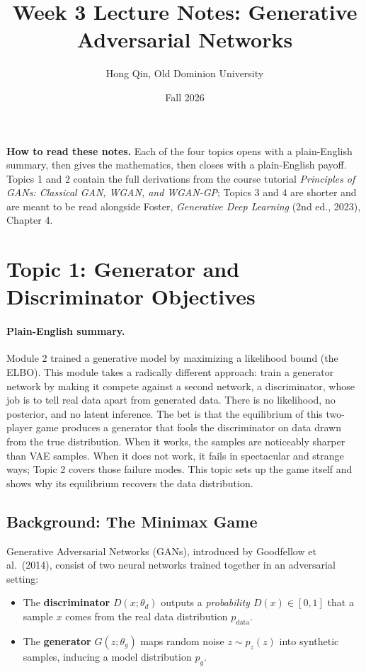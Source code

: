 \documentclass[11pt]{article}
\title{Week 3 Lecture Notes: Generative Adversarial Networks}
\author{Hong Qin, Old Dominion University}
\date{Fall 2026}
\theoremstyle{remark}
\begin{document}
\maketitle
\tableofcontents
\bigskip

\noindent
\textbf{How to read these notes.} Each of the four topics opens with a plain-English summary, then gives the mathematics, then closes with a plain-English payoff. Topics 1 and 2 contain the full derivations from the course tutorial \emph{Principles of GANs: Classical GAN, WGAN, and WGAN-GP}; Topics 3 and 4 are shorter and are meant to be read alongside Foster, \emph{Generative Deep Learning} (2nd ed., 2023), Chapter 4.

\section{Topic 1: Generator and Discriminator Objectives}

\paragraph{Plain-English summary.}
Module 2 trained a generative model by maximizing a likelihood bound (the ELBO). This module takes a radically different approach: train a generator network by making it compete against a second network, a discriminator, whose job is to tell real data apart from generated data. There is no likelihood, no posterior, and no latent inference. The bet is that the equilibrium of this two-player game produces a generator that fools the discriminator on data drawn from the true distribution. When it works, the samples are noticeably sharper than VAE samples. When it does not work, it fails in spectacular and strange ways; Topic 2 covers those failure modes. This topic sets up the game itself and shows why its equilibrium recovers the data distribution.

\subsection{Background: The Minimax Game}

Generative Adversarial Networks (GANs), introduced by Goodfellow et al.\ (2014), consist of two neural networks trained together in an adversarial setting:
\begin{itemize}
    \item The \textbf{discriminator} $D(x;\theta_d)$ outputs a \emph{probability $D(x)\in[0,1]$} that a sample $x$ comes from the real data distribution $p_{\text{data}}$.
    \item The \textbf{generator} $G(z;\theta_g)$ maps random noise $z\sim p_z(z)$ into synthetic samples, inducing a model distribution $p_g$.
\end{itemize}
\end{document}
